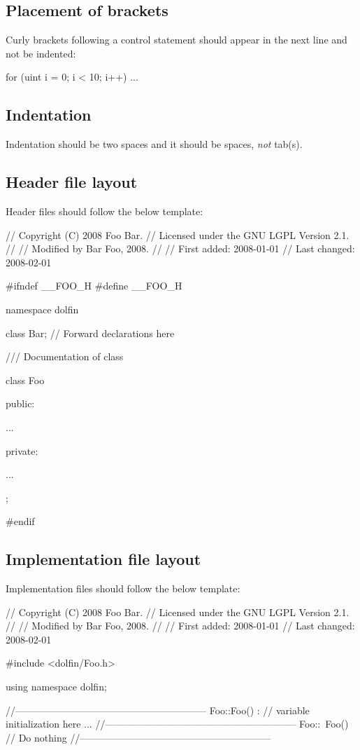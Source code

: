 \subsection{Placement of brackets}

Curly brackets following a control statement should appear in the next
line and not be indented:
\begin{code}
for (uint i = 0; i < 10; i++)
{
  ...
}
\end{code}

\subsection{Indentation}

Indentation should be two spaces and it should be spaces, \emph{not}
tab(s).

\subsection{Header file layout}

Header files should follow the below template:
\vspace{-0.5cm}
\begin{code}
// Copyright (C) 2008 Foo Bar.
// Licensed under the GNU LGPL Version 2.1.
//
// Modified by Bar Foo, 2008.
//
// First added:  2008-01-01
// Last changed: 2008-02-01

#ifndef __FOO_H
#define __FOO_H

namespace dolfin
{

  class Bar; // Forward declarations here

  /// Documentation of class

  class Foo
  {
  public:

    ...

  private:

    ...

  };

}

#endif
\end{code}

\subsection{Implementation file layout}

Implementation files should follow the below template:
\begin{code}
// Copyright (C) 2008 Foo Bar.
// Licensed under the GNU LGPL Version 2.1.
//
// Modified by Bar Foo, 2008.
//
// First added:  2008-01-01
// Last changed: 2008-02-01

#include <dolfin/Foo.h>

using namespace dolfin;

//-----------------------------------------------------------
Foo::Foo() : // variable initialization here
{
  ...
}
//-----------------------------------------------------------
Foo::~Foo()
{
  // Do nothing
}
//-----------------------------------------------------------
\end{code}

